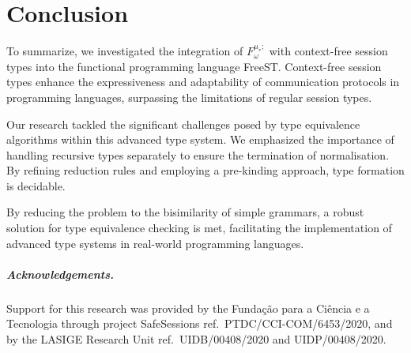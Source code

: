 
\chapter{Conclusion}



To summarize, we investigated the integration of  $F^{\mu_*;}_\omega$ with context-free session types into the functional programming language FreeST. Context-free session types enhance the expressiveness and adaptability of communication protocols in programming languages, surpassing the limitations of regular session types. 

Our research tackled the significant challenges posed by type equivalence algorithms within this advanced type system. We emphasized the importance of handling recursive types separately to ensure the termination of normalisation. By refining reduction rules and employing a pre-kinding approach, type formation is decidable.

By reducing the problem to the bisimilarity of simple grammars, a robust solution for type equivalence checking is met, facilitating the implementation of advanced type systems in real-world programming languages.
\medskip

\paragraph{Acknowledgements.}
  Support for this research was provided by the Fundação para a Ciência e a
  Tecnologia through project SafeSessions ref.\ PTDC/CCI-COM/6453/2020, and by the
  LASIGE Research Unit ref.\ UIDB/00408/2020
  and UIDP/00408/2020.
